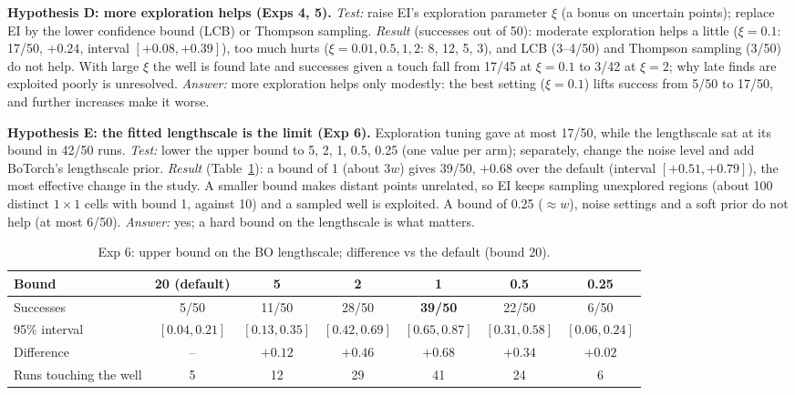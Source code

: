 \documentclass[10pt,a4paper]{article}
\begin{document}
\textbf{Hypothesis D: more exploration helps (Exps 4, 5).} \emph{Test:} raise EI's exploration parameter $\xi$ (a bonus on uncertain points); replace EI by the lower confidence bound (LCB) or Thompson sampling. \emph{Result} (successes out of 50): moderate exploration helps a little ($\xi=0.1$: 17/50, $+0.24$, interval $[+0.08,+0.39]$), too much hurts ($\xi=0.01,0.5,1,2$: 8, 12, 5, 3), and LCB (3--4/50) and Thompson sampling (3/50) do not help. With large $\xi$ the well is found late and successes given a touch fall from 17/45 at $\xi=0.1$ to 3/42 at $\xi=2$; why late finds are exploited poorly is unresolved. \emph{Answer:} more exploration helps only modestly: the best setting ($\xi=0.1$) lifts success from 5/50 to 17/50, and further increases make it worse.

\textbf{Hypothesis E: the fitted lengthscale is the limit (Exp 6).} Exploration tuning gave at most 17/50, while the lengthscale sat at its bound in 42/50 runs. \emph{Test:} lower the upper bound to 5, 2, 1, 0.5, 0.25 (one value per arm); separately, change the noise level and add BoTorch's lengthscale prior. \emph{Result} (Table~\ref{tab:cap}): a bound of 1 (about $3w$) gives 39/50, $+0.68$ over the default (interval $[+0.51,+0.79]$), the most effective change in the study. A smaller bound makes distant points unrelated, so EI keeps sampling unexplored regions (about 100 distinct $1\times1$ cells with bound 1, against 10) and a sampled well is exploited. A bound of 0.25 ($\approx w$), noise settings and a soft prior do not help (at most 6/50). \emph{Answer:} yes; a hard bound on the lengthscale is what matters.

\begin{table}[!ht]
\centering\footnotesize
\caption{Exp 6: upper bound on the BO lengthscale; difference vs the default (bound 20).}\label{tab:cap}
\begin{tabular}{@{}lcccccc@{}}
\toprule
Bound & 20 (default) & 5 & 2 & 1 & 0.5 & 0.25 \\
\midrule
Successes & 5/50 & 11/50 & 28/50 & \textbf{39/50} & 22/50 & 6/50 \\
95\% interval & $[0.04,0.21]$ & $[0.13,0.35]$ & $[0.42,0.69]$ & $[0.65,0.87]$ & $[0.31,0.58]$ & $[0.06,0.24]$ \\
Difference & -- & $+0.12$ & $+0.46$ & $+0.68$ & $+0.34$ & $+0.02$ \\
Runs touching the well & 5 & 12 & 29 & 41 & 24 & 6 \\
\bottomrule
\end{tabular}
\end{table}
\end{document}
